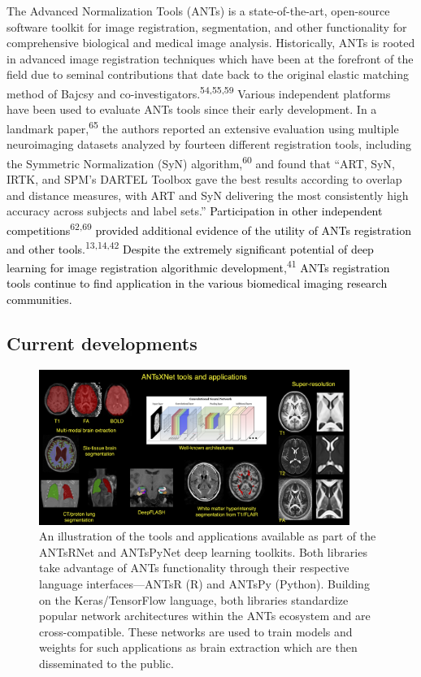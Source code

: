 \documentclass[
  12pt,
]{article}
\begin{document}
The Advanced Normalization Tools (ANTs) is a state-of-the-art,
open-source software toolkit for image registration, segmentation, and
other functionality for comprehensive biological and medical image
analysis. Historically, ANTs is rooted in advanced image registration
techniques which have been at the forefront of the field due to seminal
contributions that date back to the original elastic matching method of
Bajcsy and co-investigators.\textsuperscript{54,55,59} Various
independent platforms have been used to evaluate ANTs tools since their
early development. In a landmark paper,\textsuperscript{65} the authors
reported an extensive evaluation using multiple neuroimaging datasets
analyzed by fourteen different registration tools, including the
Symmetric Normalization (SyN) algorithm,\textsuperscript{60} and found
that ``ART, SyN, IRTK, and SPM's DARTEL Toolbox gave the best results
according to overlap and distance measures, with ART and SyN delivering
the most consistently high accuracy across subjects and label sets.''
\textcolor{black}{Participation in other independent competitions}\textsuperscript{62,69}
\textcolor{black}{provided additional evidence of
the utility of ANTs registration and other tools}.\textsuperscript{13,14,42}
\textcolor{black}{Despite the
extremely significant potential of deep learning for image registration
algorithmic development},\textsuperscript{41}
\textcolor{black}{ANTs registration
tools continue to find application in the various biomedical imaging research
communities.}

\hypertarget{current-developments}{%
\subsection*{Current developments}\label{current-developments}}

\begin{figure}[htbp]
  \centering
    \includegraphics[width=0.9\textwidth]{Figures/coreANtsXNetTools.png}
    \caption{An illustration of the tools and applications available as part of the
    ANTsRNet and ANTsPyNet deep learning toolkits.  Both libraries take advantage
    of ANTs functionality through their respective language interfaces---ANTsR (R)
    and ANTsPy (Python).  Building on the Keras/TensorFlow language, both libraries
    standardize popular network architectures within the ANTs ecosystem and are
    cross-compatible.  These networks are used to train models and weights for such
    applications as brain extraction which are then disseminated to the public.}
 \label{fig:antsXnetTools}
 \end{figure}
\end{document}
